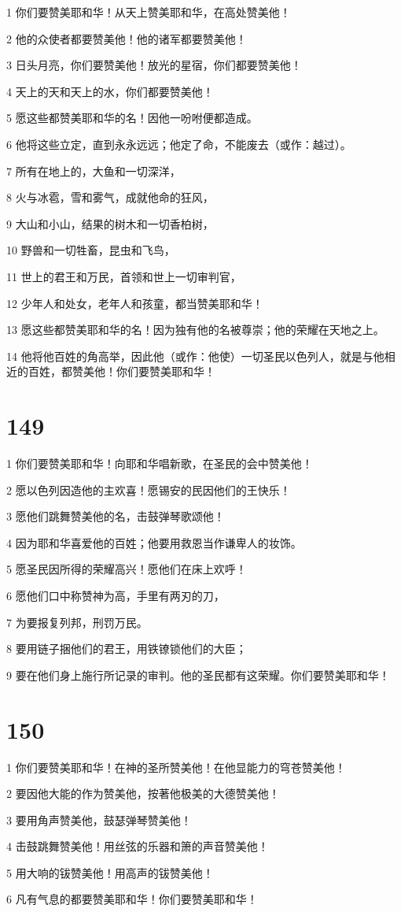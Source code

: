 \par 1 你们要赞美耶和华！从天上赞美耶和华，在高处赞美他！
\par 2 他的众使者都要赞美他！他的诸军都要赞美他！
\par 3 日头月亮，你们要赞美他！放光的星宿，你们都要赞美他！
\par 4 天上的天和天上的水，你们都要赞美他！
\par 5 愿这些都赞美耶和华的名！因他一吩咐便都造成。
\par 6 他将这些立定，直到永永远远；他定了命，不能废去（或作：越过）。
\par 7 所有在地上的，大鱼和一切深洋，
\par 8 火与冰雹，雪和雾气，成就他命的狂风，
\par 9 大山和小山，结果的树木和一切香柏树，
\par 10 野兽和一切牲畜，昆虫和飞鸟，
\par 11 世上的君王和万民，首领和世上一切审判官，
\par 12 少年人和处女，老年人和孩童，都当赞美耶和华！
\par 13 愿这些都赞美耶和华的名！因为独有他的名被尊崇；他的荣耀在天地之上。
\par 14 他将他百姓的角高举，因此他（或作：他使）一切圣民以色列人，就是与他相近的百姓，都赞美他！你们要赞美耶和华！

\chapter{149}

\par 1 你们要赞美耶和华！向耶和华唱新歌，在圣民的会中赞美他！
\par 2 愿以色列因造他的主欢喜！愿锡安的民因他们的王快乐！
\par 3 愿他们跳舞赞美他的名，击鼓弹琴歌颂他！
\par 4 因为耶和华喜爱他的百姓；他要用救恩当作谦卑人的妆饰。
\par 5 愿圣民因所得的荣耀高兴！愿他们在床上欢呼！
\par 6 愿他们口中称赞神为高，手里有两刃的刀，
\par 7 为要报复列邦，刑罚万民。
\par 8 要用链子捆他们的君王，用铁镣锁他们的大臣；
\par 9 要在他们身上施行所记录的审判。他的圣民都有这荣耀。你们要赞美耶和华！

\chapter{150}

\par 1 你们要赞美耶和华！在神的圣所赞美他！在他显能力的穹苍赞美他！
\par 2 要因他大能的作为赞美他，按著他极美的大德赞美他！
\par 3 要用角声赞美他，鼓瑟弹琴赞美他！
\par 4 击鼓跳舞赞美他！用丝弦的乐器和箫的声音赞美他！
\par 5 用大响的钹赞美他！用高声的钹赞美他！
\par 6 凡有气息的都要赞美耶和华！你们要赞美耶和华！



